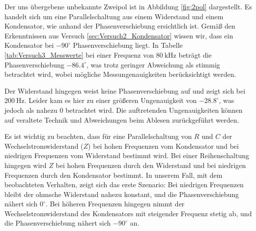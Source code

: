        Der uns übergebene unbekannte Zweipol ist in Abbildung \ref{fig:2pol} dargestellt. Es handelt sich um eine Parallelschaltung aus einem Widerstand und einem Kondensator, wie anhand der Phasenverschiebung ersichtlich ist. Gemäß den Erkenntnissen aus Versuch \ref{sec:Versuch2_Kondensator} wissen wir, dass ein Kondensator bei $-90^{\circ}$ Phasenverschiebung liegt. In Tabelle \ref{tab:Versuch3_Messwerte} bei einer Frequenz von $80\ \mathrm{kHz}$ beträgt die Phasenverschiebung $-86.4^{\circ}$, was trotz geringer Abweichung als stimmig betrachtet wird, wobei mögliche Messungenauigkeiten berücksichtigt werden.

        Der Widerstand hingegen weist keine Phasenverschiebung auf und zeigt sich bei $200\ \mathrm{Hz}$. Leider kam es hier zu einer größeren Ungenauigkeit von $-28.8^{\circ}$, was jedoch als nahezu $0$ betrachtet wird. Die auftretenden Ungenauigkeiten können auf veraltete Technik und Abweichungen beim Ablesen zurückgeführt werden.

        Es ist wichtig zu beachten, dass für eine Parallelschaltung von $R$ und $C$ der Wechselstromwiderstand ($Z$) bei hohen Frequenzen vom Kondensator und bei niedrigen Frequenzen vom Widerstand bestimmt wird. Bei einer Reihenschaltung hingegen wird $Z$ bei hohen Frequenzen durch den Widerstand und bei niedrigen Frequenzen durch den Kondensator bestimmt. In unserem Fall, mit dem beobachteten Verhalten, zeigt sich das erste Szenario: Bei niedrigen Frequenzen bleibt der ohmsche Widerstand nahezu konstant, und die Phasenverschiebung nähert sich $0^{\circ}$. Bei höheren Frequenzen hingegen nimmt der Wechselstromwiderstand des Kondensators mit steigender Frequenz stetig ab, und die Phasenverschiebung nähert sich $-90^{\circ}$ an.